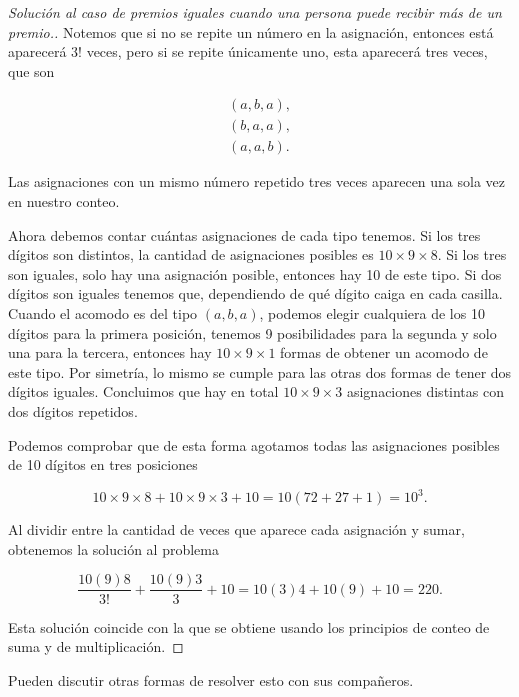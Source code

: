 \documentclass{article}
\begin{document}
\begin{enumerate}
\begin{proof}[Solución al caso de premios iguales cuando una persona puede recibir más de un premio.]
    Notemos que si no se repite un número en la asignación, entonces está aparecerá $3!$ veces, pero si se repite únicamente uno, esta aparecerá tres veces, que son

    \begin{align*}
        (a,b,a),\\
        (b,a,a),\\
        (a,a,b).
    \end{align*}

    Las asignaciones con un mismo número repetido tres veces aparecen una sola vez en nuestro conteo. 
    
    Ahora debemos contar cuántas asignaciones de cada tipo tenemos. Si los tres dígitos son distintos, la cantidad de asignaciones posibles es $10\times 9\times 8$. Si los tres son iguales, solo hay una asignación posible, entonces hay 10 de este tipo. Si dos dígitos son iguales tenemos que, dependiendo de qué dígito caiga en cada casilla. Cuando el acomodo es del tipo $(a,b,a)$, podemos elegir cualquiera de los 10 dígitos para la primera posición, tenemos 9 posibilidades para la segunda y solo una para la tercera, entonces hay $10\times9\times1$ formas de obtener un acomodo de este tipo. Por simetría, lo mismo se cumple para las otras dos formas de tener dos dígitos iguales. Concluimos que hay en total $10\times9\times3$ asignaciones distintas con dos dígitos repetidos.

    Podemos comprobar que de esta forma agotamos todas las asignaciones posibles de 10 dígitos en tres posiciones

    \[ 10\times9\times8 + 10\times9\times 3 + 10 = 10( 72 + 27 + 1 ) = 10^3. \]

    Al dividir entre la cantidad de veces que aparece cada asignación y sumar, obtenemos la solución al problema

    \[ \frac{10(9)8}{3!} + \frac{10(9)3}{3} + 10 = 10(3)4 + 10(9) + 10 = 220. \]

    Esta solución coincide con la que se obtiene usando los principios de conteo de suma y de multiplicación.

        
    \end{proof}

    Pueden discutir otras formas de resolver esto con sus compañeros. 
    
    
\end{enumerate}
\end{document}
